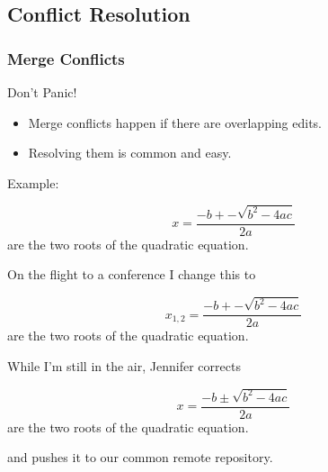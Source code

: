 \subsection{Conflict Resolution}


\begin{frame}[fragile]
  \frametitle{Merge Conflicts}
  
  \begin{center}
    \Large Don't Panic!
  \end{center}

  \begin{itemize}
  \item 
    Merge conflicts happen if there are overlapping edits.
  \item 
    Resolving them is common and easy.
  \end{itemize}
  
  Example:
  \begin{latexCode}
    \begin{equation}
      \label{eq:quad}
      x = \frac{-b+-\sqrt{b^2-4ac}}{2a}
    \end{equation}
    are the two roots of the quadratic equation.
  \end{latexCode}
  
\end{frame}



\begin{frame}[fragile]
  
  On the flight to a conference I change this to
  \begin{latexCode}
    \begin{equation}
      \label{eq:quad}
      x_{1,2} = \frac{-b+-\sqrt{b^2-4ac}}{2a}
    \end{equation}
    are the two roots of the quadratic equation.
  \end{latexCode}
  \bigskip
  \pause
  
  While I'm still in the air, Jennifer corrects
  \begin{latexCode}
    \begin{equation}
      \label{eq:quad}
      x = \frac{-b\pm\sqrt{b^2-4ac}}{2a}
    \end{equation}
    are the two roots of the quadratic equation.
  \end{latexCode}
  and pushes it to our common remote repository.
  
\end{frame}


